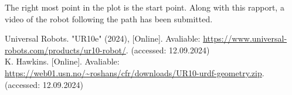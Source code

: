 \documentclass[11pt, A4paper, norsk]{article}
\begin{document}
The right most point in the plot is the start point. Along with this rapport, a video of the robot following the path has been submitted.

	\begin{thebibliography}{9}
Universal Robots. "UR10e" (2024), [Online]. Avaliable: \url{https://www.universal-robots.com/products/ur10-robot/}. (accessed: 12.09.2024) \\
K. Hawkins. [Online]. Avaliable: \url{https://web01.usn.no/~roshans/cfr/downloads/UR10-urdf-geometry.zip}. (accessed: 12.09.2024)
	\end{thebibliography}
\end{document}
